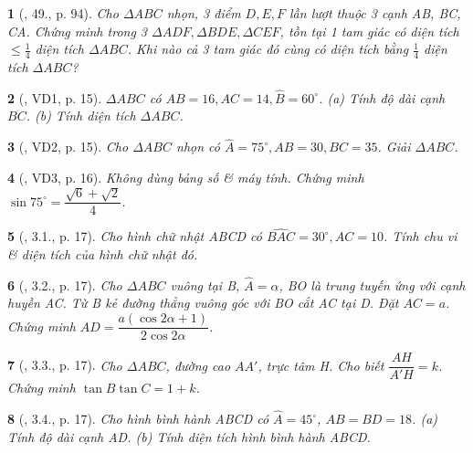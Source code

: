 \documentclass{article}
\newtheorem{baitoan}{}
\begin{document}
\begin{baitoan}[\cite{Binh_Toan_9_tap_1}, 49., p. 94]
	Cho $\Delta ABC$ nhọn, 3 điểm $D,E,F$ lần lượt thuộc 3 cạnh AB, BC, CA. Chứng minh trong 3 $\Delta ADF,\Delta BDE,\Delta CEF$, tồn tại 1 tam giác có diện tích $\le\frac{1}{4}$ diện tích $\Delta ABC$. Khi nào cả 3 tam giác đó cùng có diện tích bằng $\frac{1}{4}$ diện tích $\Delta ABC$?
\end{baitoan}

\begin{baitoan}[\cite{TLCT_THCS_Toan_9_hinh_hoc}, VD1, p. 15]
	$\Delta ABC$ có $AB = 16,AC = 14,\widehat{B} = 60^\circ$. (a) Tính độ dài cạnh $BC$. (b) Tính diện tích $\Delta ABC$.
\end{baitoan}

\begin{baitoan}[\cite{TLCT_THCS_Toan_9_hinh_hoc}, VD2, p. 15]
	Cho $\Delta ABC$ nhọn có $\widehat{A} = 75^\circ,AB = 30,BC = 35$. Giải $\Delta ABC$.
\end{baitoan}

\begin{baitoan}[\cite{TLCT_THCS_Toan_9_hinh_hoc}, VD3, p. 16]
	Không dùng bảng số \& máy tính. Chứng minh $\sin75^\circ = \dfrac{\sqrt{6} + \sqrt{2}}{4}$.
\end{baitoan}

\begin{baitoan}[\cite{TLCT_THCS_Toan_9_hinh_hoc}, 3.1., p. 17]
	Cho hình chữ nhật ABCD có $\widehat{BAC} = 30^\circ,AC = 10$. Tính chu vi \& diện tích của hình chữ nhật đó.
\end{baitoan}

\begin{baitoan}[\cite{TLCT_THCS_Toan_9_hinh_hoc}, 3.2., p. 17]
	Cho $\Delta ABC$ vuông tại B, $\widehat{A} = \alpha$, BO là trung tuyến ứng với cạnh huyền AC. Từ B kẻ đường thẳng vuông góc với BO cắt AC tại D. Đặt $AC = a$. Chứng minh $AD = \dfrac{a(\cos2\alpha + 1)}{2\cos2\alpha}$.
\end{baitoan}

\begin{baitoan}[\cite{TLCT_THCS_Toan_9_hinh_hoc}, 3.3., p. 17]
	Cho $\Delta ABC$, đường cao $AA'$, trực tâm H. Cho biết $\dfrac{AH}{A'H} = k$. Chứng minh $\tan B\tan C = 1 + k$.
\end{baitoan}

\begin{baitoan}[\cite{TLCT_THCS_Toan_9_hinh_hoc}, 3.4., p. 17]
	Cho hình bình hành ABCD có $\widehat{A} = 45^\circ$, $AB = BD = 18$. (a) Tính độ dài cạnh AD. (b) Tính diện tích hình bình hành ABCD.
\end{baitoan}
\end{document}
